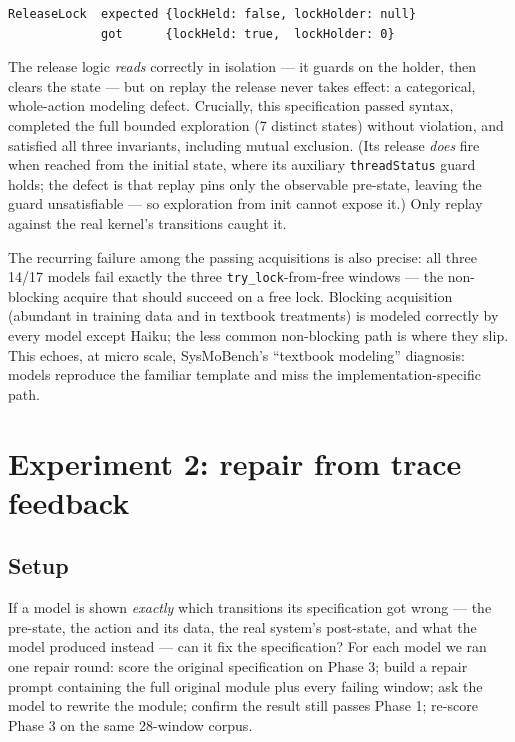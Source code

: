 \documentclass[11pt]{article}
\begin{document}
\begin{lstlisting}[style=code]
ReleaseLock  expected {lockHeld: false, lockHolder: null}
             got      {lockHeld: true,  lockHolder: 0}
\end{lstlisting}

The release logic \emph{reads} correctly in isolation --- it guards on the
holder, then clears the state --- but on replay the release never takes
effect: a categorical, whole-action modeling defect. Crucially, this
specification passed syntax, completed the full bounded exploration (7
distinct states) without violation, and satisfied all three invariants,
including mutual exclusion. (Its release \emph{does} fire when reached from
the initial state, where its auxiliary \texttt{threadStatus} guard holds; the
defect is that replay pins only the observable pre-state, leaving the guard
unsatisfiable --- so exploration from init cannot expose it.) Only replay
against the real kernel's transitions caught it.

The recurring failure among the passing acquisitions is also precise: all
three 14/17 models fail exactly the three \texttt{try\_lock}-from-free
windows --- the non-blocking acquire that should succeed on a free lock.
Blocking acquisition (abundant in training data and in textbook treatments)
is modeled correctly by every model except Haiku; the less common
non-blocking path is where they slip. This echoes, at micro scale,
SysMoBench's ``textbook modeling'' diagnosis: models reproduce the familiar
template and miss the implementation-specific path.

\section{Experiment 2: repair from trace feedback}
\label{sec:repair}

\subsection{Setup}

If a model is shown \emph{exactly} which transitions its specification got
wrong --- the pre-state, the action and its data, the real system's
post-state, and what the model produced instead --- can it fix the
specification? For each model we ran one repair round: score the original
specification on Phase 3; build a repair prompt containing the full original
module plus every failing window; ask the model to rewrite the module;
confirm the result still passes Phase 1; re-score Phase 3 on the same
28-window corpus.
\end{document}
